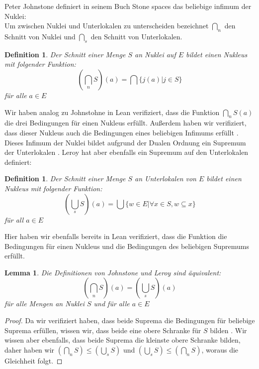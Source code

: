 \documentclass{article}
\newtheorem{lemma}[satz]{Lemma}
\newtheorem{definition}[satz]{Definition}
\begin{document}
Peter Johnstone definiert in seinem Buch \glqq Stone spaces\grqq{} \autocite{johnstone_stone_1982} %
das beliebige infimum der Nuklei: \\
Um zwischen Nuklei und Unterlokalen zu unterscheiden bezeichnet $\bigcap_n$ den Schnitt von Nuklei und $\bigcap_s$ den Schnitt von Unterlokalen. \\
\begin{definition}
    Der Schnitt einer Menge $S$ an Nuklei auf $E$ bildet einen Nukleus mit folgender Funktion:
    $$(\bigcap_n S)(a) = \bigcap \{j(a) | j \in S\} $$ für alle $a \in E$\\
\end{definition}
Wir haben analog zu Johnstohne in Lean verifiziert, dass die Funktion $\bigcap_n S(a)$ die drei Bedingungen für einen Nukleus erfüllt. %
Außerdem haben wir verifiziert, dass dieser Nukleus auch die Bedingungen eines beliebigen Infimums erfüllt \autocite{noauthor_mathlibordercompletelattice_nodate}.\\ 
Dieses Infimum der Nuklei bildet aufgrund der Dualen Ordnung ein Supremum der Unterlokalen \autocite{noauthor_supremum_nodate}. Leroy hat aber ebenfalls ein Supremum auf den Unterlokalen definiert:
\begin{definition}
    Der Schnitt einer Menge $S$ an Unterlokalen von $E$ bildet einen Nukleus mit folgender Funktion:
    $$(\bigcup_s S)(a) = \bigcup \{w \in E | \forall x \in S,w \subseteq x\} $$ für all $a \in E$
\end{definition}
Hier haben wir ebenfalls bereits in Lean verifiziert, dass die Funktion die Bedingungen für einen Nukleus und die Bedingungen des beliebigen Supremums erfüllt. \\

\begin{lemma}
    Die Definitionen von Johnstone und Leroy \autocite[S. 5]{leroy_theorie_2013} sind äquivalent: 
        $$(\bigcap_n S) (a) = (\bigcup_s S) (a)$$ für alle Mengen an Nuklei $S$ und für alle $a \in E$ \\
\end{lemma}
\begin{proof}
    Da wir verifiziert haben, dass beide Suprema die Bedingungen für beliebige Suprema erfüllen, wissen wir, dass beide eine obere Schranke für $S$ bilden \autocite{noauthor_beschrankte_2021}. 
    Wir wissen aber ebenfalls, dass beide Suprema die kleinste obere Schranke bilden, daher haben wir $(\bigcap_n S) \le (\bigcup_s S)$ und  $(\bigcup_s S) \le (\bigcap_n S)$, woraus die Gleichheit folgt.
\end{proof}
\end{document}
